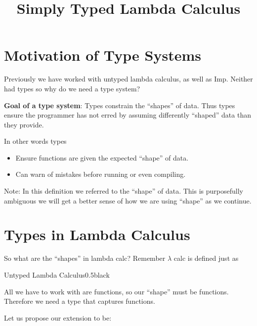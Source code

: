 \documentclass{lecturenotes}
\title{Simply Typed Lambda Calculus}
\begin{document}
\maketitle

\raggedright
 
\section{Motivation of Type Systems}

Previously we have worked with untyped lambda calculus, as well as Imp. 
  Neither had types so why do we need a type system? 

\textbf{Goal of a type system}: Types constrain the ``shapes'' of data. 
  Thus types ensure the programmer has not erred by assuming differently ``shaped'' data than they provide. 

In other words types
\begin{itemize}
  \item Ensure functions are given the expected ``shape'' of data. 
  \item Can warn of mistakes before running or even compiling. 
\end{itemize}

\noindent Note: In this definition we referred to the ``shape'' of data. 
  This is purposefully ambiguous we will get a better sense of how we are using ``shape'' as we continue. 

\section{Types in Lambda Calculus}

So what are the ``shapes'' in lambda calc? 
  Remember $\lambda$ calc is defined just as 

\begin{center}
\begin{alert}{Untyped Lambda Calculus}{0.5\textwidth}{black}
  \begin{syntax}   
  \end{syntax}
\end{alert}
\end{center}

All we have to work with are functions, so our ``shape'' must be functions. 
  Therefore we need a type that captures functions. 
  
Let us propose our extension to be:
\end{document}
